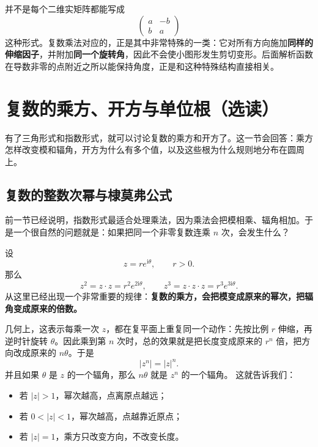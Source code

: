 \begin{tishi}[特殊矩阵形式的来源]
并不是每个二维实矩阵都能写成
\[
\begin{pmatrix}
    a & -b\\
    b & a
\end{pmatrix}
\]
这种形式。复数乘法对应的，正是其中非常特殊的一类：它对所有方向施加\textbf{同样的伸缩因子}，并附加\textbf{同一个旋转角}，因此不会使小图形发生剪切变形。后面解析函数在导数非零的点附近之所以能保持角度，正是和这种特殊结构直接相关。
\end{tishi}

\section{复数的乘方、开方与单位根（选读）}

\begin{wulibj}[为什么这一节很重要]
有了三角形式和指数形式，就可以讨论复数的乘方和开方了。这一节会回答：乘方怎样改变模和辐角，开方为什么有多个值，以及这些根为什么规则地分布在圆周上。
\end{wulibj}

\subsection{复数的整数次幂与棣莫弗公式}

前一节已经说明，指数形式最适合处理乘法，因为乘法会把模相乘、辐角相加。于是一个很自然的问题就是：如果把同一个非零复数连乘 $n$ 次，会发生什么？

设
\[
z=re^{\mathrm{i}\theta},\qquad r>0.
\]
那么
\[
z^2=z\cdot z=r^2 e^{2\mathrm{i}\theta},\qquad
z^3=z\cdot z\cdot z=r^3 e^{3\mathrm{i}\theta}.
\]
从这里已经出现一个非常重要的规律：\textbf{复数的乘方，会把模变成原来的幂次，把辐角变成原来的倍数。}

几何上，这表示每乘一次 $z$，都在复平面上重复同一个动作：先按比例 $r$ 伸缩，再逆时针旋转 $\theta$。因此乘到第 $n$ 次时，总的效果就是把长度变成原来的 $r^n$ 倍，把方向改成原来的 $n\theta$。于是
\[
|z^n|=|z|^n.
\]
并且如果 $\theta$ 是 $z$ 的一个辐角，那么 $n\theta$ 就是 $z^n$ 的一个辐角。
这就告诉我们：
\begin{itemize}
    \item 若 $|z|>1$，幂次越高，点离原点越远；
    \item 若 $0<|z|<1$，幂次越高，点越靠近原点；
    \item 若 $|z|=1$，乘方只改变方向，不改变长度。
\end{itemize}


